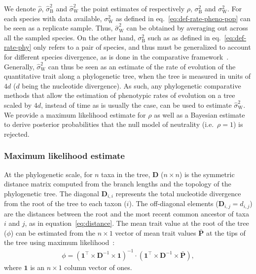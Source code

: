 \documentclass{article}
\newcommand{\Multiply}{\cdot}
\newcommand{\MultiplyMatrix}{\times}
\newcommand{\UniDimArray}[1]{\bm{#1}}
\newcommand{\BiDimArray}[1]{\bm{#1}}
\newcommand{\tr}{^{\intercal}}
\newcommand{\inv}{^{-1}}
\newcommand{\Spi}{i}
\newcommand{\Spj}{j}
\newcommand{\NbrTaxa}{n}
\newcommand{\NucDiv}{d_{\Spi, \Spj}}
\newcommand{\Trait}{P}
\newcommand{\VecTrait}{\UniDimArray{\bar{\Trait}}}
\newcommand{\RootTrait}{\phi}
\newcommand{\VecOne}{\UniDimArray{1}}
\newcommand{\Distance}{\BiDimArray{D}}
\newcommand{\DistanceMatrix}{\BiDimArray{\Distance}}
\newcommand{\RateBetween}{\sigma^2_{\mathrm{B}}}
\newcommand{\RateWhithin}{\sigma^2_{\mathrm{W}}}
\newcommand{\EstRateBetween}{\widehat{\sigma}^2_{\mathrm{B}}}
\newcommand{\EstRateWhithin}{\widehat{\sigma}^2_{\mathrm{W}}}
\newcommand{\NI}{\rho}
\newcommand{\EstNI}{\widehat{\rho}}
\begin{document}
We denote $\EstNI$, $\EstRateBetween$ and $\EstRateWhithin$ the point estimates of respectively $\NI$, $\RateBetween$ and $\RateWhithin$.
For each species with data available, $\RateWhithin$ as defined in eq.~\ref{eq:def-rate-pheno-pop} can be seen as a replicate sample.
Thus, $\EstRateWhithin$ can be obtained by averaging out across all the sampled species.
On the other hand, $\RateBetween$ such as as defined in eq.~\ref{eq:def-rate-phy} only refers to a pair of species, and thus must be generalized to account for different species divergence, as is done in the comparative framework~\citep{felsenstein_phylogenies_1985, omeara_testing_2006}.
Generally, $\EstRateWhithin$ can thus be seen as an estimate of the rate of evolution of the quantitative trait along a phylogenetic tree, when the tree is measured in units of $4d$ ($d$ being the nucleotide divergence).
As such, any phylogenetic comparative methods that allow the estimation of phenotypic rates of evolution on a tree scaled by $4d$, instead of time as is usually the case, can be used to estimate $\EstRateWhithin$.
We provide a maximum likelihood estimate for $\NI$ as well as a Bayesian estimate to derive posterior probabilities that the null model of neutrality (i.e.~$\NI = 1$) is rejected.

\subsubsection*{Maximum likelihood estimate}
At the phylogenetic scale, for $\NbrTaxa$ taxa in the tree, $\DistanceMatrix$ ($\NbrTaxa \times \NbrTaxa$) is the symmetric distance matrix computed from the branch lengths and the topology of the phylogenetic tree.
The diagonal $\Distance_{\Spi,\Spi}$ represents the total nucleotide divergence from the root of the tree to each taxon ($\Spi$).
The off-diagonal elements ($\Distance_{\Spi,\Spj} = \NucDiv$) are the distances between the root and the most recent common ancestor of taxa $\Spi$ and $\Spj$, as in equation~\ref{eq:distance}.
The mean trait value at the root of the tree ($\RootTrait$) can be estimated from the $\NbrTaxa \times 1$ vector of mean trait values $\VecTrait$ at the tips of the tree using maximum likelihood~\citep{omeara_testing_2006}:
\begin{gather}
    \RootTrait = \left( \VecOne\tr \MultiplyMatrix \DistanceMatrix\inv \MultiplyMatrix \VecOne \right)\inv \Multiply \left( \VecOne\tr \MultiplyMatrix \DistanceMatrix\inv \MultiplyMatrix \VecTrait \right), \label{eq:estimated-root-trait}
\end{gather}
where $\VecOne$ is an $\NbrTaxa \times 1$ column vector of ones.
\end{document}
